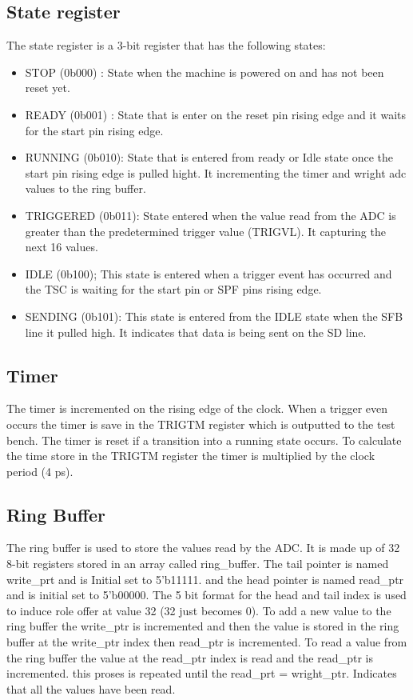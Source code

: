 \subsection{State register}
The state register is a 3-bit register that has the following states:
\begin{itemize}
      \item STOP (0b000) :
            State when the machine is powered on and has not been reset yet.
      \item READY (0b001) :
            State that is enter on the reset pin rising edge and it waits for the start pin rising edge.
      \item RUNNING (0b010):
            State that is entered from ready or Idle state once the start pin rising edge is pulled hight.
            It incrementing the timer and wright adc values to the ring buffer.
      \item TRIGGERED (0b011):
            State entered when the value read from the ADC is
            greater than the predetermined trigger value (TRIGVL).
            It capturing the next 16 values.
      \item IDLE (0b100);
            This state is entered when a trigger event has occurred
            and the TSC is waiting for the start pin or SPF pins rising edge.
      \item SENDING (0b101):
            This state is entered from the IDLE state when the SFB line it pulled high.
            It indicates that data is being sent on the SD line.
\end{itemize}


\subsection{Timer}
The timer is incremented on the rising edge of the clock. When
a trigger even occurs the timer is save in the TRIGTM register which is outputted to the test bench.
The timer is reset if a transition into a running state occurs.
To calculate the time store in the TRIGTM register the timer is multiplied by the clock period (4 ps).


\subsection{Ring Buffer}
The ring buffer is used to store the values read by the ADC.
It is made up of 32 8-bit registers stored in an array called ring\_buffer.
The tail pointer is named write\_prt and is Initial set to 5'b11111.
and the head pointer is named read\_ptr and is initial set to 5'b00000.
The 5 bit format for the head and tail index is used to induce role offer at value 32 (32 just becomes 0).
To add a new value to the ring buffer the write\_ptr is incremented and then the
value is stored in the ring buffer at the write\_ptr index then read\_ptr is incremented.
To read a value from the ring buffer the value at the read\_ptr index is read and the read\_ptr is incremented.
this proses is repeated until the read\_prt = wright\_ptr. Indicates that all the values have been read.

